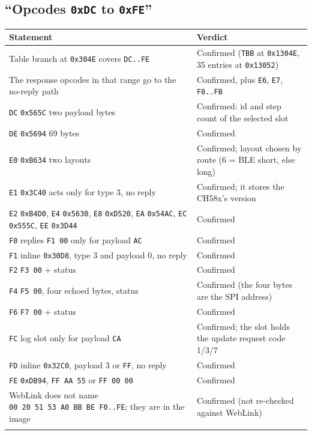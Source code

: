\subsection{\texorpdfstring{``Opcodes \texttt{0xDC} to
\texttt{0xFE}''}{``Opcodes 0xDC to 0xFE''}}\label{opcodes-0xdc-to-0xfe}

{\def\LTcaptype{none} %
\begin{longtable}[]{@{}
  >{\raggedright\arraybackslash}p{}
  >{\raggedright\arraybackslash}p{}@{}}
\toprule\noalign{}
\begin{minipage}[b]{\linewidth}\raggedright
Statement
\end{minipage} & \begin{minipage}[b]{\linewidth}\raggedright
Verdict
\end{minipage} \\
\midrule\noalign{}
\endhead
\bottomrule\noalign{}
\endlastfoot
Table branch at \texttt{0x304E} covers \texttt{DC..FE} & Confirmed
(\texttt{TBB} at \texttt{0x1304E}, 35 entries at \texttt{0x13052}) \\
The response opcodes in that range go to the no-reply path & Confirmed,
plus \texttt{E6}, \texttt{E7}, \texttt{F8..FB} \\
\texttt{DC} \texttt{0x565C} two payload bytes & Confirmed: id and step
count of the selected slot \\
\texttt{DE} \texttt{0x5694} 69 bytes & Confirmed \\
\texttt{E0} \texttt{0xB634} two layouts & Confirmed; layout chosen by
route (6 = BLE short, else long) \\
\texttt{E1} \texttt{0x3C40} acts only for type 3, no reply & Confirmed;
it stores the CH58x's version \\
\texttt{E2} \texttt{0xB4D0}, \texttt{E4} \texttt{0x5630}, \texttt{E8}
\texttt{0xD520}, \texttt{EA} \texttt{0x54AC}, \texttt{EC}
\texttt{0x555C}, \texttt{EE} \texttt{0x3D44} & Confirmed \\
\texttt{F0} replies \texttt{F1\ 00} only for payload \texttt{AC} &
Confirmed \\
\texttt{F1} inline \texttt{0x30D8}, type 3 and payload 0, no reply &
Confirmed \\
\texttt{F2} \texttt{F3\ 00} + status & Confirmed \\
\texttt{F4} \texttt{F5\ 00}, four echoed bytes, status & Confirmed (the
four bytes are the SPI address) \\
\texttt{F6} \texttt{F7\ 00} + status & Confirmed \\
\texttt{FC} log slot only for payload \texttt{CA} & Confirmed; the slot
holds the update request code 1/3/7 \\
\texttt{FD} inline \texttt{0x32C0}, payload 3 or \texttt{FF}, no reply &
Confirmed \\
\texttt{FE} \texttt{0xDB94}, \texttt{FF\ AA\ 55} or \texttt{FF\ 00\ 00}
& Confirmed \\
WebLink does not name \texttt{00\ 20\ 51\ 53\ A0\ BB\ BE\ F0..FE}; they
are in the image & Confirmed (not re-checked against WebLink) \\*
\end{longtable}
}

